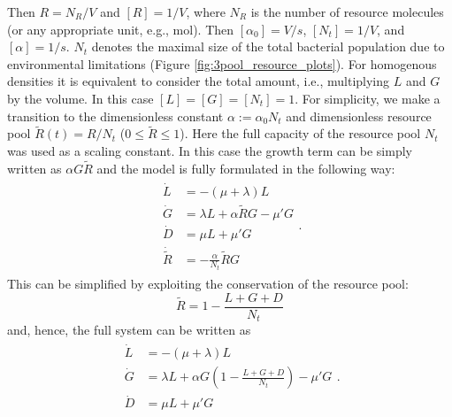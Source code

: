 \documentclass[10pt,twocolumn,5p]{elsarticle}
\numberwithin{equation}{section}
\begin{document}
Then $R=N_R/V$ and $[R]=1/V$, where $N_R$ is the number of resource molecules (or any appropriate unit, e.g., mol).
Then $[\alpha_0]=V/s$, $[N_t]=1/V$, and $[\alpha]=1/s$.
$N_t$ denotes the maximal size of the total bacterial population due to environmental limitations (Figure \ref{fig:3pool_resource_plots}).
For homogenous densities it is equivalent to consider the total amount, i.e., multiplying $L$ and $G$ by the volume.
In this case $[L]=[G]=[N_t]=1$.
For simplicity, we make a transition to the dimensionless constant $\alpha:=\alpha_0 N_t$ and dimensionless resource pool $\tilde{R}(t) = R/ N_t$ ($0 \leqslant \tilde{R} \leqslant 1$).
Here the full capacity of the resource pool $N_t$ was used as a scaling constant.
In this case the growth term can be simply written as $\alpha G \tilde{R}$ and the model is fully formulated in the following way:
\begin{align}
    \begin{split}
        \dot{L} &= -(\mu + \lambda) L\\
        \dot{G} &= \lambda L + \alpha \tilde{R} G-\mu' G\\
        \dot{D} &= \mu  L + \mu' G\\
        \dot{\tilde{R}} &= - \frac{\alpha}{N_t} \tilde{R} G
    \end{split}.
\label{eq:ode_3pool_resource}
\end{align}
%
This can be simplified by exploiting the conservation of the resource pool:
\begin{equation}
    \tilde{R} = 1 - \frac{L+G+D}{N_t}
\end{equation}
and, hence, the full system can be written as
\begin{align}
    \begin{split}
        \dot{L} &= -(\mu + \lambda) L\\
        \dot{G} &= \lambda L + \alpha G\left(1-\frac{L+G+D}{N_t}\right)-\mu' G\\
        \dot{D} &= \mu  L + \mu' G
    \end{split}.
\label{eq:ode_3pool_resource2}
\end{align}
%
%
\end{document}
